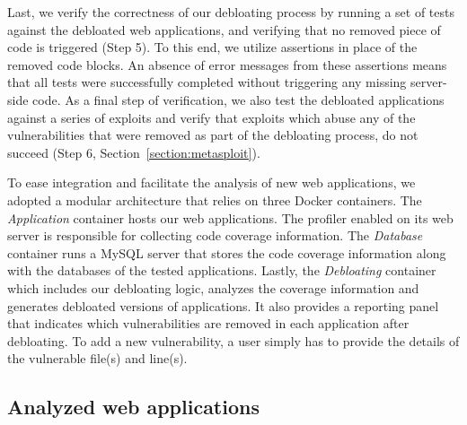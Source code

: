 Last, we verify the correctness of our debloating process by running
a set of tests against the debloated web applications, and verifying that
no removed piece of code is triggered (Step 5). To this end, we
utilize assertions in place of the removed code blocks. An absence of error
messages from these assertions means that all tests were successfully
completed without triggering any missing server-side code. As a final step of
verification, we also test the debloated applications against a series of
exploits and verify that exploits which
abuse any of the vulnerabilities that were removed as part of the debloating
process, do not succeed (Step 6, Section~\ref{section:metasploit}).

To ease integration and facilitate the analysis of new web applications, we
adopted a modular architecture that relies on three Docker containers. The
\textit{Application} container hosts our web applications.  The profiler
enabled on its web server is responsible for collecting code coverage
information. The \textit{Database} container runs a MySQL server that
stores the code coverage information along with the databases of the tested
applications. Lastly, the \textit{Debloating} container which includes our
debloating logic, analyzes the coverage information and generates debloated
versions of applications. It also provides a reporting panel that indicates
which vulnerabilities are removed in each application after debloating. To add
a new vulnerability, a user simply has to provide the details of the vulnerable
file(s) and line(s).



\subsection{Analyzed web applications}
\label{subsec:webapps}

